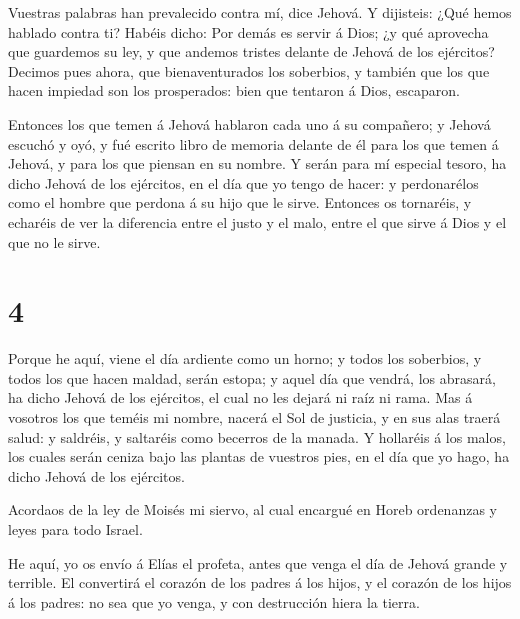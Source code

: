  Vuestras palabras han prevalecido contra mí, dice Jehová.
Y dijisteis: ¿Qué hemos hablado contra ti?  Habéis dicho:
Por demás es servir á Dios; ¿y qué aprovecha que guardemos su ley, y que
andemos tristes delante de Jehová de los ejércitos? 
Decimos pues ahora, que bienaventurados los soberbios, y también que los
que hacen impiedad son los prosperados: bien que tentaron á Dios,
escaparon.

 Entonces los que temen á Jehová hablaron cada uno á su
compañero; y Jehová escuchó y oyó, y fué escrito libro de memoria
delante de él para los que temen á Jehová, y para los que piensan en su
nombre.  Y serán para mí especial tesoro, ha dicho Jehová
de los ejércitos, en el día que yo tengo de hacer: y perdonarélos como
el hombre que perdona á su hijo que le sirve.  Entonces os
tornaréis, y echaréis de ver la diferencia entre el justo y el malo,
entre el que sirve á Dios y el que no le sirve.

\hypertarget{section-3}{%
\section{4}\label{section-3}}

 Porque he aquí, viene el día ardiente como un horno; y
todos los soberbios, y todos los que hacen maldad, serán estopa; y aquel
día que vendrá, los abrasará, ha dicho Jehová de los ejércitos, el cual
no les dejará ni raíz ni rama.  Mas á vosotros los que
teméis mi nombre, nacerá el Sol de justicia, y en sus alas traerá salud:
y saldréis, y saltaréis como becerros de la manada.  Y
hollaréis á los malos, los cuales serán ceniza bajo las plantas de
vuestros pies, en el día que yo hago, ha dicho Jehová de los ejércitos.

 Acordaos de la ley de Moisés mi siervo, al cual encargué en
Horeb ordenanzas y leyes para todo Israel.

 He aquí, yo os envío á Elías el profeta, antes que venga el
día de Jehová grande y terrible.  El convertirá el corazón
de los padres á los hijos, y el corazón de los hijos á los padres: no
sea que yo venga, y con destrucción hiera la tierra.
